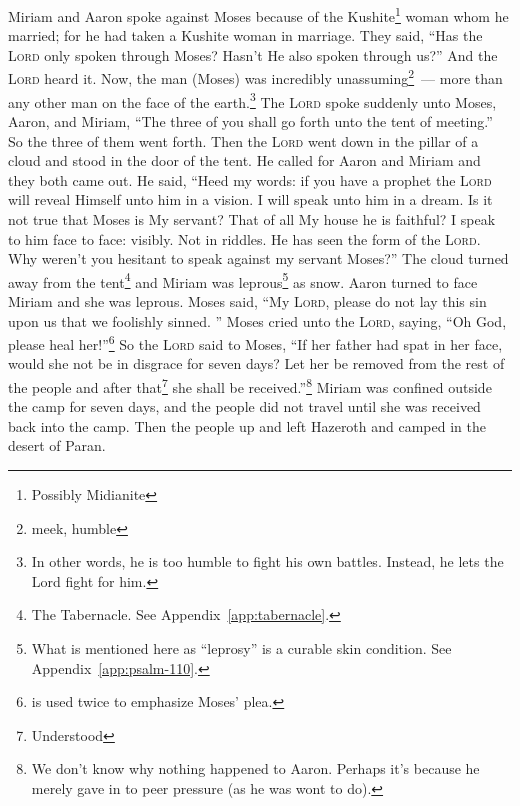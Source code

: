 
\begin{enumerate*}[mode=unboxed]
     Miriam and Aaron spoke against Moses because of the Kushite\footnote{Possibly Midianite} woman whom he married; for he had taken a Kushite woman in marriage.%
     They said, ``Has the \textsc{Lord} only spoken through Moses? Hasn't He also spoken through us?'' And the \textsc{Lord} heard it.%
     Now, the man (Moses) was incredibly unassuming\footnote{meek, humble}~--- more than any other man on the face of the earth.\footnote{In other words, he is too humble to fight his own battles. Instead, he lets the Lord fight for him.}%
     The \textsc{Lord} spoke suddenly unto Moses, Aaron, and Miriam, ``The three of you shall go forth unto the tent of meeting.'' So the three of them went forth.%
     Then the \textsc{Lord} went down in the pillar of a cloud and stood in the door of the tent. He called for Aaron and Miriam and they both came out.%
     He said, ``Heed my words: if you have a prophet the \textsc{Lord} will reveal Himself unto him in a vision. I will speak unto him in a dream.%
     Is it not true that Moses is My servant? That of all My house he is faithful?%
     I speak to him face to face: visibly. Not in riddles. He has seen the form of the \textsc{Lord}. Why weren't you hesitant to speak against my servant Moses?''%
     The cloud turned away from the tent\footnote{The Tabernacle. See Appendix~\ref{app:tabernacle}.} and Miriam was leprous\footnote{What is mentioned here as ``leprosy'' is a curable skin condition. See Appendix~\ref{app:psalm-110}.} as snow. Aaron turned to face Miriam and she was leprous.
     Moses said, ``My \textsc{Lord}, please do not lay this sin upon us that we foolishly sinned.%
     ''%
     Moses cried unto the \textsc{Lord}, saying, ``Oh God, please heal her!''\footnote{ is used twice to emphasize Moses' plea.}%
     So the \textsc{Lord} said to Moses, ``If her father had spat in her face, would she not be in disgrace for seven days? Let her be removed from the rest of the people and after that\footnote{Understood} she shall be received.''\footnote{We don't know why nothing happened to Aaron. Perhaps it's because he merely gave in to peer pressure (as he was wont to do).}%
     Miriam was confined outside the camp for seven days, and the people did not travel until she was received back into the camp.%
     Then the people up and left Hazeroth and camped in the desert of Paran.%
\end{enumerate*}
